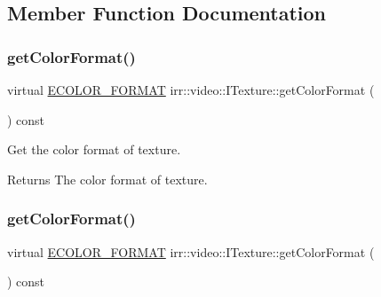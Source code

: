 \subsection{Member Function Documentation}
\mbox{\label{classirr_1_1video_1_1ITexture_a48bbc0208c046724fc3264406f774132}} 
\subsubsection{\texorpdfstring{get\+Color\+Format()}{getColorFormat()}\hspace{0.1cm}{\footnotesize\ttfamily [1/2]}}
{\footnotesize\ttfamily virtual \hyperlink{namespaceirr_1_1video_a1d5e487888c32b1674a8f75116d829ed}{E\+C\+O\+L\+O\+R\+\_\+\+F\+O\+R\+M\+AT} irr\+::video\+::\+I\+Texture\+::get\+Color\+Format (\begin{DoxyParamCaption}{ }\end{DoxyParamCaption}) const\hspace{0.3cm}{\ttfamily [pure virtual]}}



Get the color format of texture. 

\begin{DoxyReturn}{Returns}
The color format of texture. 
\end{DoxyReturn}
\mbox{\label{classirr_1_1video_1_1ITexture_a48bbc0208c046724fc3264406f774132}} 
\subsubsection{\texorpdfstring{get\+Color\+Format()}{getColorFormat()}\hspace{0.1cm}{\footnotesize\ttfamily [2/2]}}
{\footnotesize\ttfamily virtual \hyperlink{namespaceirr_1_1video_a1d5e487888c32b1674a8f75116d829ed}{E\+C\+O\+L\+O\+R\+\_\+\+F\+O\+R\+M\+AT} irr\+::video\+::\+I\+Texture\+::get\+Color\+Format (\begin{DoxyParamCaption}{ }\end{DoxyParamCaption}) const\hspace{0.3cm}{\ttfamily [pure virtual]}}



